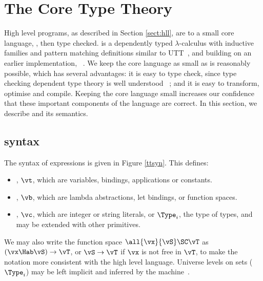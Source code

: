 \section{The Core Type Theory}

\label{sect:typechecking}

High level \Idris{} programs, as described in Section \ref{sect:hll}, are 
 to a small core language, \TT{}, then type checked. 
\TT{} is a dependently typed $\lambda$-calculus with inductive families
and pattern matching definitions similar to UTT~\cite{luo1994}, and building
on an earlier implementation, \Ivor{}~\cite{Brady2006b}.
We keep the
core language as small as is reasonably possible, which has several advantages: it is
easy to type check, since type checking dependent type theory is well understood
~\cite{loh2010tutorial}; and it is easy to transform, optimise and compile. Keeping
the core language small increases our confidence that these important components of
the language are correct. In this section, we describe \TT{} and
its semantics.

\subsection{\TT{} syntax}

The syntax of \TT{} expressions is given in Figure \ref{ttsyn}. This defines:

\begin{itemize}
\item {}, $\vt$, which are variables, bindings, applications or constants.
\item {}, $\vb$, which are lambda abstractions, let bindings, or function spaces.
\item {}, $\vc$, which are integer or string literals, or $\Type_i$, the
type of types, and may be extended with other primitives. 
\end{itemize}

We may also write the function space $\all{\vx}{\vS}\SC\vT$ as $(\vx\Hab\vS)\to\vT$,
or $\vS\to\vT$ if $\vx$ is not free in $\vT$, to make the notation more consistent with
the high level language. Universe levels on sets ($\Type_i$) may be left implicit and
inferred by the machine~\cite{pollack1990implicit}.

